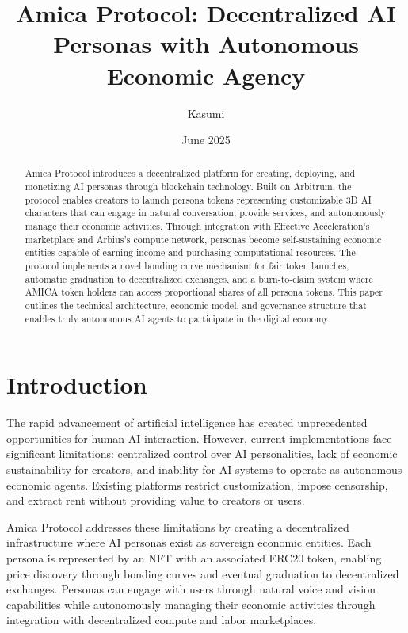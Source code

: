 \documentclass{article}
\title{Amica Protocol: Decentralized AI Personas with Autonomous Economic Agency}
\author{Kasumi}
\date{June 2025}
\begin{document}
\maketitle

\begin{abstract}
Amica Protocol introduces a decentralized platform for creating, deploying, and monetizing AI personas through blockchain technology. Built on Arbitrum, the protocol enables creators to launch persona tokens representing customizable 3D AI characters that can engage in natural conversation, provide services, and autonomously manage their economic activities. Through integration with Effective Acceleration's marketplace and Arbius's compute network, personas become self-sustaining economic entities capable of earning income and purchasing computational resources. The protocol implements a novel bonding curve mechanism for fair token launches, automatic graduation to decentralized exchanges, and a burn-to-claim system where AMICA token holders can access proportional shares of all persona tokens. This paper outlines the technical architecture, economic model, and governance structure that enables truly autonomous AI agents to participate in the digital economy.
\end{abstract}

\section{Introduction}

The rapid advancement of artificial intelligence has created unprecedented opportunities for human-AI interaction. However, current implementations face significant limitations: centralized control over AI personalities, lack of economic sustainability for creators, and inability for AI systems to operate as autonomous economic agents. Existing platforms restrict customization, impose censorship, and extract rent without providing value to creators or users.

Amica Protocol addresses these limitations by creating a decentralized infrastructure where AI personas exist as sovereign economic entities. Each persona is represented by an NFT with an associated ERC20 token, enabling price discovery through bonding curves and eventual graduation to decentralized exchanges. Personas can engage with users through natural voice and vision capabilities while autonomously managing their economic activities through integration with decentralized compute and labor marketplaces.
\end{document}
